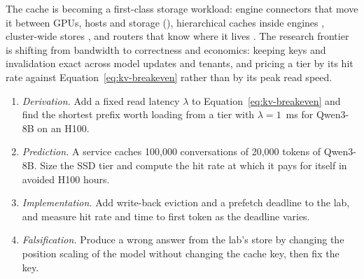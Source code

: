 
The cache is becoming a first-class storage workload: engine connectors that
move it between GPUs, hosts and storage (),
hierarchical caches inside engines \cite{sglang2026hicache}, cluster-wide stores
\cite{qin2024mooncake,deepseek2025threefs}, and routers that know where it
lives \cite{nvidia2026dynamo,llmd2026}. The research frontier is shifting from
bandwidth to correctness and economics: keeping keys and invalidation exact
across model updates and tenants, and pricing a tier by its hit rate against
Equation~\ref{eq:kv-breakeven} rather than by its peak read speed.

\ExercisesSection

\begin{enumerate}
\item \emph{Derivation.} Add a fixed read latency $\lambda$ to
  Equation~\ref{eq:kv-breakeven} and find the shortest prefix worth loading
  from a tier with $\lambda = 1$~ms for Qwen3-8B on an H100.
\item \emph{Prediction.} A service caches 100,000 conversations of 20,000
  tokens of Qwen3-8B. Size the SSD tier and compute the hit rate at which it
  pays for itself in avoided H100 hours.
\item \emph{Implementation.} Add write-back eviction and a prefetch deadline
  to the lab, and measure hit rate and time to first token as the deadline
  varies.
\item \emph{Falsification.} Produce a wrong answer from the lab's store by
  changing the position scaling of the model without changing the cache key,
  then fix the key.
\end{enumerate}
